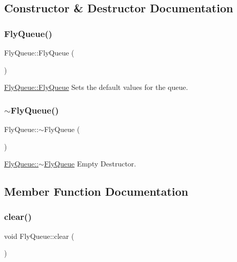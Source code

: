 \subsection{Constructor \& Destructor Documentation}
\hypertarget{class_fly_queue_adc5d5138e7023af3697e3275b25d78d0}{}\label{class_fly_queue_adc5d5138e7023af3697e3275b25d78d0} 
\subsubsection{\texorpdfstring{Fly\+Queue()}{FlyQueue()}}
{\footnotesize\ttfamily Fly\+Queue\+::\+Fly\+Queue (\begin{DoxyParamCaption}{ }\end{DoxyParamCaption})}



\hyperlink{class_fly_queue_adc5d5138e7023af3697e3275b25d78d0}{Fly\+Queue\+::\+Fly\+Queue} Sets the default values for the queue. 

\hypertarget{class_fly_queue_aba6188b6f39aac0a1386e72d30f0dd74}{}\label{class_fly_queue_aba6188b6f39aac0a1386e72d30f0dd74} 
\subsubsection{\texorpdfstring{$\sim$\+Fly\+Queue()}{~FlyQueue()}}
{\footnotesize\ttfamily Fly\+Queue\+::$\sim$\+Fly\+Queue (\begin{DoxyParamCaption}{ }\end{DoxyParamCaption})}



\hyperlink{class_fly_queue_aba6188b6f39aac0a1386e72d30f0dd74}{Fly\+Queue\+::$\sim$\+Fly\+Queue} Empty Destructor. 



\subsection{Member Function Documentation}
\hypertarget{class_fly_queue_ae4112aad97978a82e09f6ad5cfe7f5dc}{}\label{class_fly_queue_ae4112aad97978a82e09f6ad5cfe7f5dc} 
\subsubsection{\texorpdfstring{clear()}{clear()}}
{\footnotesize\ttfamily void Fly\+Queue\+::clear (\begin{DoxyParamCaption}{ }\end{DoxyParamCaption})}



